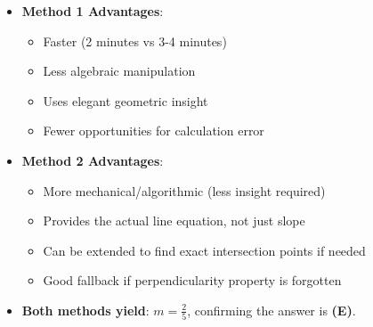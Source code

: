 \documentclass[12pt]{article}
\begin{document}
\begin{solutionbox}
\begin{itemize}[leftmargin=*]
    \item \textbf{Method 1 Advantages}: 
    \begin{itemize}
        \item Faster (2 minutes vs 3-4 minutes)
        \item Less algebraic manipulation
        \item Uses elegant geometric insight
        \item Fewer opportunities for calculation error
    \end{itemize}
    \item \textbf{Method 2 Advantages}:
    \begin{itemize}
        \item More mechanical/algorithmic (less insight required)
        \item Provides the actual line equation, not just slope
        \item Can be extended to find exact intersection points if needed
        \item Good fallback if perpendicularity property is forgotten
    \end{itemize}
    \item \textbf{Both methods yield}: $m = \frac{2}{5}$, confirming the answer is \textbf{(E)}.
\end{itemize}
\end{solutionbox}
\end{document}
